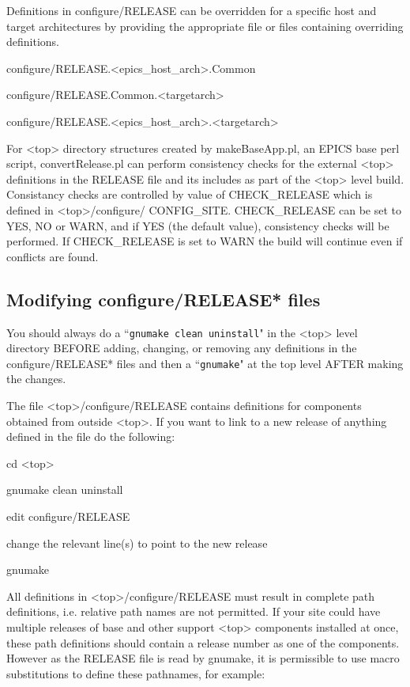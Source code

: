 Definitions in configure/RELEASE can be overridden for a specific host and target architectures by providing the 
appropriate file or files containing overriding definitions.

configure/RELEASE.\textless{}epics\_host\_arch\textgreater{}.Common

configure/RELEASE.Common.\textless{}targetarch\textgreater{}

configure/RELEASE.\textless{}epics\_host\_arch\textgreater{}.\textless{}targetarch\textgreater{}

For \textless{}top\textgreater{} directory structures created by makeBaseApp.pl, an EPICS base perl script, convertRelease.pl can perform 
consistency checks for the external \textless{}top\textgreater{} definitions in the RELEASE file and its includes as part of the \textless{}top\textgreater{} level 
build. Consistancy checks are controlled by value of CHECK\_RELEASE which is defined in \textless{}top\textgreater{}/configure/
CONFIG\_SITE. CHECK\_RELEASE can be set to YES, NO or WARN, and if YES (the default value), consistency 
checks will be performed. If CHECK\_RELEASE is set to WARN the build will continue even if conflicts are found.

\subsection{Modifying configure/RELEASE* files}

You should always do a ``\verb|gnumake clean uninstall|" in the \textless{}top\textgreater{} level directory BEFORE adding, changing, or 
removing any definitions in the configure/RELEASE* files and then a ``\verb|gnumake|" at the top level AFTER making the 
changes.

The file \textless{}top\textgreater{}/configure/RELEASE contains definitions for components obtained from outside \textless{}top\textgreater{}. If you want to link 
to a new release of anything defined in the file do the following:

cd \textless{}top\textgreater{}

gnumake clean uninstall

edit configure/RELEASE

change the relevant line(s) to point to the new release

gnumake

All definitions in \textless{}top\textgreater{}/configure/RELEASE must result in complete path definitions, i.e. relative path names are not 
permitted. If your site could have multiple releases of base and other support \textless{}top\textgreater{} components installed at once, these 
path definitions should contain a release number as one of the components. However as the RELEASE file is read by 
gnumake, it is permissible to use macro substitutions to define these pathnames, for example:

